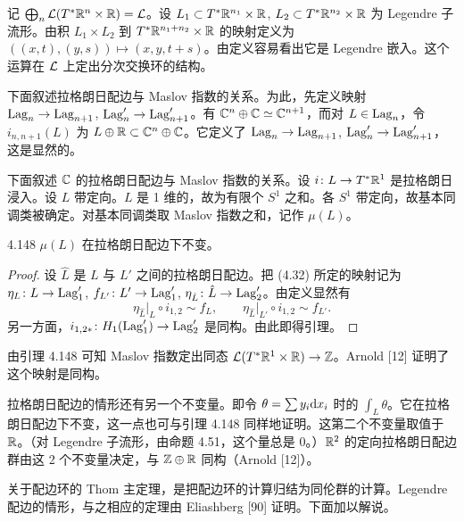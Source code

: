 记 $\bigoplus_n\mathcal{L}(T^*\mathbb{R}^n\times\mathbb{R})=\mathcal{L}$。设 $L_1\subset T^*\mathbb{R}^{n_1}\times\mathbb{R}$, $L_2\subset T^*\mathbb{R}^{n_2}\times\mathbb{R}$ 为 Legendre 子流形。由积 $L_1\times L_2$ 到 $T^*\mathbb{R}^{n_1+n_2}\times\mathbb{R}$ 的映射定义为 $((x,t),(y,s))\mapsto(x,y,t+s)$。由定义容易看出它是 Legendre 嵌入。这个运算在 $\mathcal{L}$ 上定出分次交换环的结构。

下面叙述拉格朗日配边与 Maslov 指数的关系。为此，先定义映射 $\operatorname{Lag}_n\to\operatorname{Lag}_{n+1}$, $\operatorname{Lag}'_n\to\operatorname{Lag}'_{n+1}$。有 $\mathbb{C}^n\oplus\mathbb{C}\simeq\mathbb{C}^{n+1}$，而对 $L\in\operatorname{Lag}_n$，令 $i_{n,n+1}(L)$ 为 $L\oplus\mathbb{R}\subset\mathbb{C}^n\oplus\mathbb{C}$。它定义了 $\operatorname{Lag}_n\to\operatorname{Lag}_{n+1}$, $\operatorname{Lag}'_n\to\operatorname{Lag}'_{n+1}$，这是显然的。

下面叙述 $\mathbb{C}$ 的拉格朗日配边与 Maslov 指数的关系。设 $i\colon L\to T^*\mathbb{R}^1$ 是拉格朗日浸入。设 $L$ 带定向。$L$ 是 1 维的，故为有限个 $S^1$ 之和。各 $S^1$ 带定向，故基本同调类被确定。对基本同调类取 Maslov 指数之和，记作 $\mu(L)$。

\begin{lemma*}{4.148}
  $\mu(L)$ 在拉格朗日配边下不变。
\end{lemma*}

\begin{proof}
  设 $\hat L$ 是 $L$ 与 $L'$ 之间的拉格朗日配边。把 (4.32) 所定的映射记为 $\eta_L\colon L\to\operatorname{Lag}'_1$, $f_{L'}\colon L'\to\operatorname{Lag}'_1$, $\eta_{\hat L}\colon\hat L\to\operatorname{Lag}'_2$。由定义显然有
  \[
    \eta_{\hat L}\vert_L\circ i_{1,2}\sim f_L,\qquad \eta_{\hat L}\vert_{L'}\circ i_{1,2}\sim f_{L'}.
  \]
  另一方面，$i_{1,2*}\colon H_1(\operatorname{Lag}'_1)\to\operatorname{Lag}'_2$ 是同构。由此即得引理。
\end{proof}


由引理 4.148 可知 Maslov 指数定出同态 $\mathcal{L}(T^*\mathbb{R}^1\times\mathbb{R})\to\mathbb{Z}$。Arnold [12] 证明了这个映射是同构。

拉格朗日配边的情形还有另一个不变量。即令 $\theta=\sum y_i\mathrm{d} x_i$ 时的 $\int_L\theta$。它在拉格朗日配边下不变，这一点也可与引理 4.148 同样地证明。这第二个不变量取值于 $\mathbb{R}$。（对 Legendre 子流形，由命题 4.51，这个量总是 0。）$\mathbb{R}^2$ 的定向拉格朗日配边群由这 2 个不变量决定，与 $\mathbb{Z}\oplus\mathbb{R}$ 同构（Arnold [12]）。

关于配边环的 Thom 主定理，是把配边环的计算归结为同伦群的计算。Legendre 配边的情形，与之相应的定理由 Eliashberg [90] 证明。下面加以解说。

